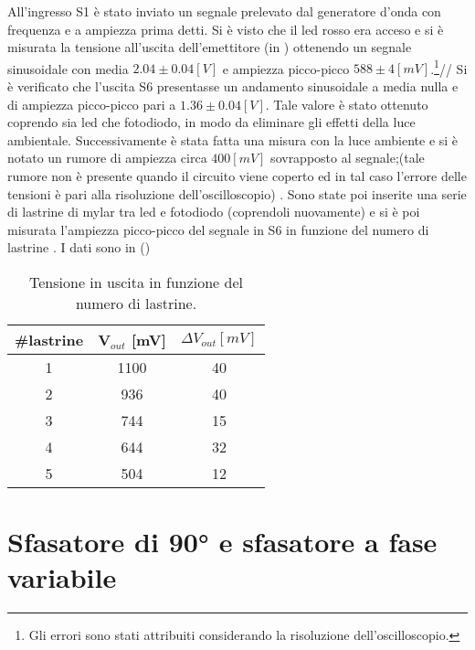 All'ingresso S1 è stato inviato un segnale prelevato dal generatore d'onda con frequenza e a ampiezza prima detti. Si è visto che il led rosso era acceso e si è misurata la tensione all'uscita dell'emettitore (in ) ottenendo un segnale sinusoidale con media $2.04 \pm 0.04 [V]$ e ampiezza picco-picco $588 \pm 4 [mV]$.\footnote{Gli errori sono stati attribuiti considerando la risoluzione dell'oscilloscopio.}//
Si è verificato che l'uscita S6 presentasse un andamento sinusoidale a media nulla e di ampiezza picco-picco pari a $1.36 \pm 0.04 [V]$. Tale valore è stato ottenuto coprendo sia led che fotodiodo, in modo da eliminare gli effetti della luce ambientale. Successivamente è stata fatta una misura con la luce ambiente e si è notato un rumore di ampiezza circa $400 [mV]$ sovrapposto al segnale;(tale rumore non è presente quando il circuito viene coperto ed in tal caso l'errore delle tensioni è pari alla risoluzione dell'oscilloscopio) . Sono state poi inserite una serie di lastrine di mylar tra led e fotodiodo (coprendoli nuovamente) e si è poi misurata l'ampiezza picco-picco del segnale in S6 in funzione del numero di lastrine . I dati sono in ()

\begin{table}[h]
	\centering
	\begin{tabular}{ccc}		
		 {\#lastrine }& {V$_{out}$ [mV]}& {$\Delta V_{out}[mV]$}\\
		 \midrule
                       1 & 1100 & 40\\
                       2 & 936 & 40\\
                       3 & 744 & 15\\
                       4 & 644 & 32\\
                       5 & 504 & 12\\
 	\end{tabular}
	\caption{Tensione in uscita in funzione del numero di lastrine.}
	\label{t:lastrine}
\end{table}

\section{Sfasatore di 90° e sfasatore a fase variabile}

